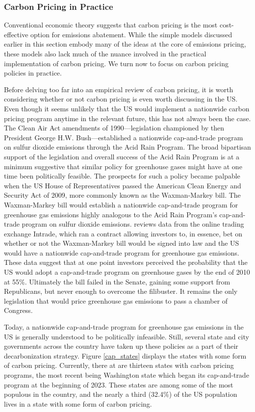 \subsubsection{Carbon Pricing in Practice}

Conventional economic theory suggests that carbon pricing is the most  cost-effective option for emissions abatement. While the simple models discussed earlier in this section embody many of the ideas at the core of emissions pricing, these models also lack much of the nuance involved in the practical implementation of carbon pricing. We turn now to focus on carbon pricing policies in practice. 

Before delving too far into an empirical review of carbon pricing, it is worth considering whether or not carbon pricing is even worth discussing in the US. Even though it seems unlikely that the US would implement a nationwide carbon pricing program anytime in the relevant future, this has not always been the case. The Clean Air Act amendments of 1990---legislation championed by then President George H.W. Bush---established a nationwide cap-and-trade program on sulfur dioxide emissions through the Acid Rain Program. The broad bipartisan support of the legislation and overall success of the Acid Rain Program is at a minimum suggestive that similar policy for greenhouse gases might have at one time been politically feasible. The prospects for such a policy became palpable when the US House of Representatives passed the American Clean Energy and Security Act of 2009, more commonly known as the Waxman-Markey bill. The Waxman-Markey bill would establish a nationwide cap-and-trade program for greenhouse gas emissions highly analogous to the Acid Rain Program's cap-and-trade program on sulfur dioxide emissions. \cite{meng2017using} reviews data from the online trading exchange Intrade, which ran a contract allowing investors to, in essence,  bet on whether or not the Waxman-Markey bill would be signed into law and the US would have a nationwide cap-and-trade program for greenhouse gas emissions. These data suggest that at one point investors perceived the probability that the US would adopt a cap-and-trade program on greenhouse gases by the end of 2010 at 55\%. Ultimately the bill failed in the Senate, gaining some support from Republicans, but never enough to overcome the filibuster. It remains the only legislation that would price greenhouse gas emissions to pass a chamber of Congress. 

Today, a nationwide cap-and-trade program for greenhouse gas emissions in the US is generally understood to be politically infeasible. Still, several state and city governments across the country have taken up these policies as a part of their decarbonization strategy. Figure \ref{cap_states} displays the states with some form of carbon pricing. Currently, there at are thirteen states with carbon pricing programs, the most recent being Washington state which began its cap-and-trade program at the beginning of 2023. These states are among some of the most populous in the country, and the nearly a third (32.4\%) of the US population lives in a state with some form of carbon pricing. 

